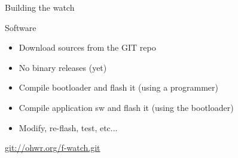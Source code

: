 \documentclass[compress,red]{beamer}
\begin{document}

\begin{frame}{Building the watch}

  Software

  \begin{itemize}
  \item Download sources from the GIT repo
  \item No binary releases (yet)
  \item Compile bootloader and flash it (using a programmer)
  \item Compile application sw and flash it (using the bootloader)
  \item Modify, re-flash, test, etc...
  \end{itemize}

  \vskip 8mm

  \begin{center}
    \url{git://ohwr.org/f-watch.git}
  \end{center}

  \note[item]{}

\end{frame}
\end{document}
